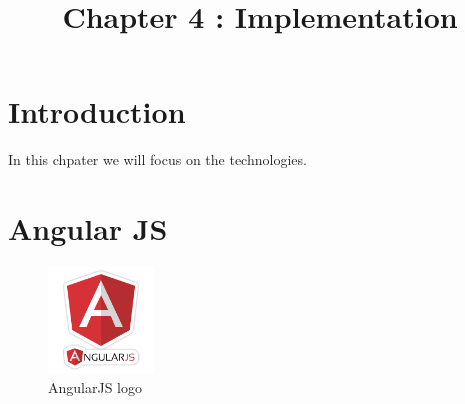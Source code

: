 \documentclass[12pt]{article}
\begin{document}
	\listoffigures
	
	\title{Chapter 4 : Implementation}
	\maketitle
	\section{Introduction}
	
	In this chpater we will focus on the technologies. 
	
	\section{Angular JS}
	
	
	\begin{figure}[h]
		\centering
		\includegraphics[width=0.25\textwidth]{AngularJS_logo.png}
		\caption{AngularJS logo}
		
	\end{figure}
	
\end{document}
